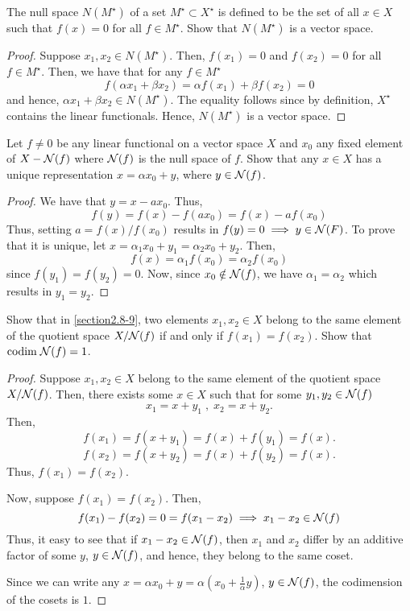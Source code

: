 \begin{question}
    The null space $N(M^\star)$ of a set $M^\star \subset X^\star$ is defined to be the set of all $x \in X$ such that $f(x) = 0$ for all $f \in M^\star$. Show that $N(M^\star)$ is a vector space.
    \label{section2.8-8}
\end{question}
\begin{proof}
    Suppose $x_1 , x_2 \in N(M^\star).$ Then, $f(x_1) = 0$ and $f(x_2) = 0$ for all $f \in M^\star$. Then, we have that for any $f \in M^\star$
    \[f(\alpha x_1 + \beta x_2) = \alpha f(x_1) + \beta f(x_2) = 0\]
    and hence, $\alpha x_1 + \beta x_2 \in N(M^\star)$. The equality follows since by definition, $X^\star$ contains the linear functionals. Hence, $N(M^\star)$ is a vector space.
\end{proof}

\begin{question}
    Let $f\neq 0$ be any linear functional on a vector space $X$ and $x_0$ any fixed element of $X - \mathcal{N}(f)$ where $\mathcal{N}(f)$ is the null space of $f$. Show that any $x \in X$ has a unique representation $x = \alpha x_0 + y$, where $y \in \mathcal{N}(f)$.
    \label{section2.8-9}
\end{question}
\begin{proof}
    We have that $y = x - ax_0$. Thus, 
    \[f(y) = f(x) - f(ax_0) = f(x) - af(x_0)\]
    Thus, setting $a = f(x) / f(x_0)$ results in $f(y) = 0 \implies y \in \mathcal{N}(F)$. To prove that it is unique, let $x = \alpha_1 x_0 + y_1 = \alpha_2 x_0 + y_2$. Then, 
    \[f(x) = \alpha_1 f(x_0) = \alpha_2 f(x_0) \]
    since $f(y_1) = f(y_2) = 0$. Now, since $x_0 \notin \mathcal{N}(f)$, we have $\alpha_1 = \alpha_2$ which results in $y_1 = y_2.$
\end{proof}

\begin{question}
    Show that in \ref{section2.8-9}, two elements $x_1 , x_2 \in X$ belong to the same element of the quotient space $X/\mathcal{N}(f)$ if and only if $f(x_1) = f(x_2)$. Show that $\textrm{codim} \; \mathcal{N}(f) = 1$.
    \label{section2.8-10}
\end{question}
\begin{proof}
    Suppose $x_1 , x_2 \in X$ belong to the same element of the quotient space $X/\mathcal{N}(f)$. Then, there exists some $x \in X$ such that for some $y_1 , y_2 \in \mathcal{N}(f)$
    \[x_1 = x + y_1 \;,\; x_2 = x + y_2.\]
    Then, 
    \[f(x_1) = f(x + y_1) = f(x) + f(y_1) = f(x).\]
    \[f(x_2) = f(x + y_2) = f(x) + f(y_2) = f(x).\]
    Thus, $f(x_1) = f(x_2).$
    
    Now, suppose $f(x_1) = f(x_2).$ Then, 
    \[f(x_1) - f(x_2) = 0 = f(x_1 - x_2) \implies x_1 - x_2 \in \mathcal{N}(f)\]
    Thus, it easy to see that if $x_1 - x_2 \in \mathcal{N}(f)$, then $x_1$ and $x_2$ differ by an additive factor of some $y$, $y \in \mathcal{N}(f)$, and hence, they belong to the same coset.

    Since we can write any $x = \alpha x_0 + y = \alpha (x_0 + \frac{1}{\alpha} y)$, $y \in \mathcal{N}(f)$, the codimension of the cosets is $1$.
\end{proof}

